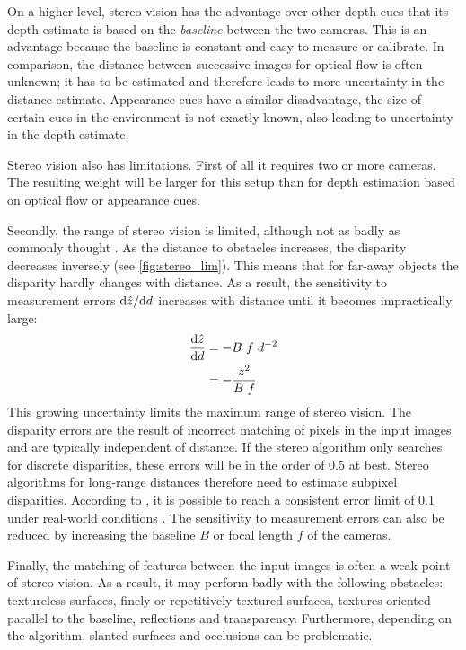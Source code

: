 \medskip

On a higher level, stereo vision has the advantage over other depth cues that its depth estimate is based on the \emph{baseline} between the two cameras.
This is an advantage because the baseline is constant and easy to measure or calibrate.
In comparison, the distance between successive images for optical flow is often unknown; it has to be estimated and therefore leads to more uncertainty in the distance estimate.
Appearance cues have a similar disadvantage, the size of certain cues in the environment is not exactly known, also leading to uncertainty in the depth estimate.

Stereo vision also has limitations.
First of all it requires two or more cameras.
The resulting weight will be larger for this setup than for depth estimation based on optical flow or appearance cues.

Secondly, the range of stereo vision is limited, although not as badly as commonly thought \cite{Pinggera2014}.
As the distance to obstacles increases, the disparity decreases inversely (see \autoref{fig:stereo_lim}).
This means that for far-away objects the disparity hardly changes with distance.
As a result, the sensitivity to measurement errors $\mathrm{d} \hat z / \mathrm{d} d$ increases with distance until it becomes impractically large:
\begin{align}
\frac{\mathrm{d} \hat z}{\mathrm{d} d} &= -B \ f \ d^{-2} \\
&= - \frac{z^2}{B\ f}
\end{align}
This growing uncertainty limits the maximum range of stereo vision.
The disparity errors are the result of incorrect matching of pixels in the input images and are typically independent of distance.
If the stereo algorithm only searches for discrete disparities, these errors will be in the order of \SI{0.5}{\px} at best.
Stereo algorithms for long-range distances therefore need to estimate subpixel disparities.
According to \citeauthor{Pinggera2014}, it is possible to reach a consistent error limit of \SI{0.1}{\px} under real-world conditions \cite{Pinggera2014}.
The sensitivity to measurement errors can also be reduced by increasing the baseline $B$ or focal length $f$ of the cameras.

Finally, the matching of features between the input images is often a weak point of stereo vision.
As a result, it may perform badly with the following obstacles: textureless surfaces, finely or repetitively textured surfaces, textures oriented parallel to the baseline, reflections and transparency.
Furthermore, depending on the algorithm, slanted surfaces and occlusions can be problematic.

